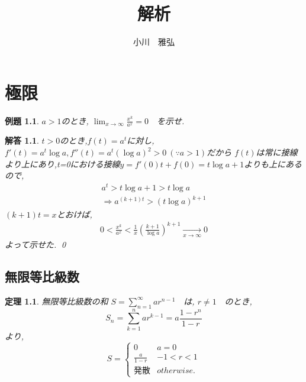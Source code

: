 \documentclass[a4paper,11pt,twocolumn]{jsbook}
\newtheorem{thm}{定理}[section]
\newtheorem{example}{例題}[section]
\newtheorem*{solution}{解答}
\begin{document}
\title{解析}
\author{小川　雅弘}
\maketitle


\chapter{極限}

\begin{screen}
  \begin{example}
    $a>1$のとき, $\lim_{x \to \infty} \frac{x^k}{a^x} = 0$　を示せ.
  \end{example}
\end{screen}
\begin{solution}
  $t>0$のとき,$f(t)=a^t$に対し,$f'(t)=a^t \log a, f''(t)=a^t (\log a)^2 > 0 \ (\because a>1)$だから
  $f(t)$は常に接線より上にあり,t=0における接線$y=f'(0)t+f(0) = t \log a + 1$よりも上にあるので,
  \begin{eqnarray*}
    a^t > t\log a + 1 > t\log a \\
    \Rightarrow a^{(k+1)t} > (t \log a)^{k+1}
  \end{eqnarray*}
  $(k+1)t=x$とおけば,
  \begin{eqnarray*}
    0 < \frac{x^k}{a^x} < \frac{1}{x} \left( \frac{k+1}{\log a} \right)^{k+1} 
    \xrightarrow[x \to \infty]{} 0
  \end{eqnarray*}
  よって示せた. \qed
\end{solution}

\section{無限等比級数}

\begin{screen}
  \begin{thm}
    無限等比級数の和 $S = \sum_{n=1}^\infty a r^{n-1}$　は, 
    $r \neq 1$　のとき,
    \begin{equation}
      S_n = \sum_{k=1}^n a r^{k-1} = a \frac{1-r^n}{1-r}
    \end{equation}
    より,
    \begin{equation}
      S =
      \begin{cases}
        0 & a=0\\
        \frac{a}{1-r} & -1<r<1\\
        発散 & otherwise.
      \end{cases}
    \end{equation}
  \end{thm}
\end{screen}
\end{document}
